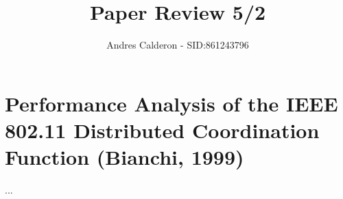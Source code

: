 \documentclass[a4paper,10pt]{scrartcl}
\title{Paper Review 5/2}
\author{Andres Calderon - SID:861243796}
\begin{document}
\maketitle
\thispagestyle{empty}

\section*{Performance Analysis of the IEEE 802.11 Distributed Coordination Function (Bianchi, 1999)}
...

\end{document}
